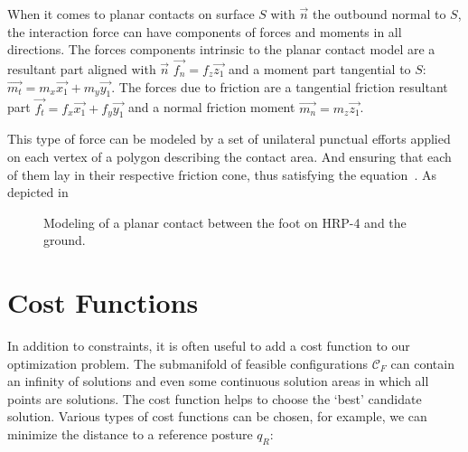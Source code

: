 When it comes to planar contacts on surface $S$ with $\vec{n}$ the outbound normal to $S$, the interaction force can have components of forces and moments in all directions.
The forces components intrinsic to the planar contact model are a resultant part aligned with $\vec{n}$ $\vec{f_n} = f_z \vec{z_1}$ and a moment part tangential to $S$: $\vec{m_t} = m_x \vec{x_1} + m_y \vec{y_1}$.
The forces due to friction are a tangential friction resultant part $\vec{f_t} = f_x \vec{x_1} + f_y \vec{y_1}$ and a normal friction moment $\vec{m_n} = m_z \vec{z_1}$.

This type of force can be modeled by a set of unilateral punctual efforts applied on each vertex of a polygon describing the contact area.
And ensuring that each of them lay in their respective friction cone, thus satisfying the equation~.
As depicted in~

\begin{figure}[htpb]
  \centering
  \setlength{\fboxsep}{0pt}%
  \setlength{\fboxrule}{1pt}%
  \caption{Modeling of a planar contact between the foot on HRP-4 and the ground.}
\label{fig:planarContact}
\end{figure}


\section{Cost Functions}
\label{sec:cost_functions}


In addition to constraints, it is often useful to add a cost function to our optimization problem.
The submanifold of feasible configurations $\mathcal{C}_F$ can contain an infinity of solutions and even some continuous solution areas in which all points are solutions.
The cost function helps to choose the `best' candidate solution.
Various types of cost functions can be chosen, for example, we can minimize the distance to a reference posture $q_R$:

